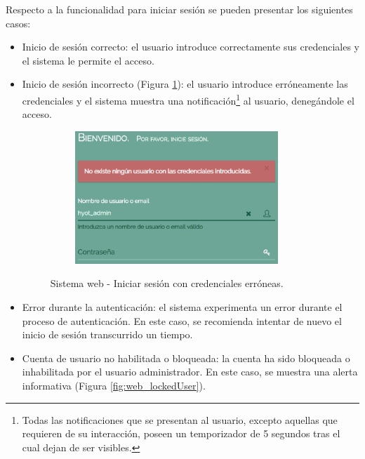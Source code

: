 \documentclass[12pt,a4paper, twoside]{report}
\begin{document}
	\newpage
	
	Respecto a la funcionalidad para iniciar sesión se pueden presentar los siguientes casos:
	
	\begin{itemize}
		\item Inicio de sesión correcto: el usuario introduce correctamente sus credenciales y el sistema le permite el acceso.
		\item Inicio de sesión incorrecto (Figura \ref{fig:web_loginError}): el usuario introduce erróneamente las credenciales y el sistema muestra una notificación\footnote{Todas las notificaciones que se presentan al usuario, excepto aquellas que requieren de su interacción, poseen un temporizador de 5 segundos tras el cual dejan de ser visibles.} al usuario, denegándole el acceso.
		
		\begin{figure}[!ht]   
			\caption{Sistema web - Iniciar sesión con credenciales erróneas.} 
			\begin{center} 
	 			\includegraphics[width=9.5cm, height=5cm]{Images/userGuide/web/loginError} \\
				\label{fig:web_loginError} 
			\end{center}  	
		\end{figure}	
		
		\item Error durante la autenticación: el sistema experimenta un error durante el proceso de autenticación. En este caso, se recomienda intentar de nuevo el inicio de sesión transcurrido un tiempo.
				
		\item Cuenta de usuario no habilitada o bloqueada: la cuenta ha sido bloqueada o inhabilitada por el usuario administrador. En este caso, se muestra una alerta informativa (Figura \ref{fig:web_lockedUser}).
				

\end{itemize}
\end{document}

